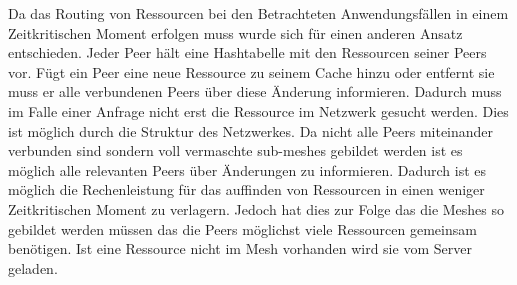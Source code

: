 Da das Routing von Ressourcen bei den Betrachteten Anwendungsfällen in einem Zeitkritischen Moment erfolgen muss wurde sich für einen anderen Ansatz entschieden. Jeder Peer hält eine Hashtabelle mit den Ressourcen seiner Peers vor. Fügt ein Peer eine neue Ressource zu seinem Cache hinzu oder entfernt sie muss er alle verbundenen Peers über diese Änderung informieren. Dadurch muss im Falle einer Anfrage nicht erst die Ressource im Netzwerk gesucht werden. Dies ist möglich durch die Struktur des Netzwerkes. Da nicht alle Peers miteinander verbunden sind sondern voll vermaschte sub-meshes gebildet werden ist es möglich alle relevanten Peers über Änderungen zu informieren. Dadurch ist es möglich die Rechenleistung für das auffinden von Ressourcen in einen weniger Zeitkritischen Moment zu verlagern. Jedoch hat dies zur Folge das die Meshes so gebildet werden müssen das die Peers möglichst viele Ressourcen gemeinsam benötigen. Ist eine Ressource nicht im Mesh vorhanden wird sie vom Server geladen. 


%

%
%


